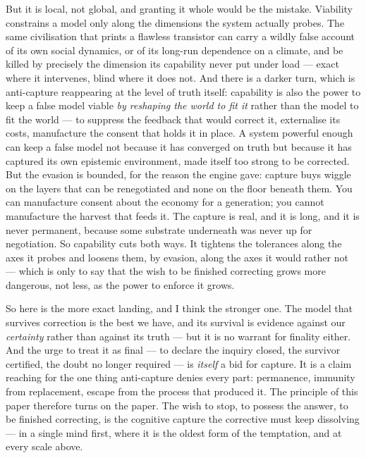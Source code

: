 \documentclass[11pt, a4paper]{report}
\begin{document}
But it is local, not global, and granting it whole would be the mistake. Viability constrains a model only along the dimensions the system actually probes. The same civilisation that prints a flawless transistor can carry a wildly false account of its own social dynamics, or of its long-run dependence on a climate, and be killed by precisely the dimension its capability never put under load --- exact where it intervenes, blind where it does not. And there is a darker turn, which is anti-capture reappearing at the level of truth itself: capability is also the power to keep a false model viable \textit{by reshaping the world to fit it} rather than the model to fit the world --- to suppress the feedback that would correct it, externalise its costs, manufacture the consent that holds it in place. A system powerful enough can keep a false model not because it has converged on truth but because it has captured its own epistemic environment, made itself too strong to be corrected. But the evasion is bounded, for the reason the engine gave: capture buys wiggle on the layers that can be renegotiated and none on the floor beneath them. You can manufacture consent about the economy for a generation; you cannot manufacture the harvest that feeds it. The capture is real, and it is long, and it is never permanent, because some substrate underneath was never up for negotiation. So capability cuts both ways. It tightens the tolerances along the axes it probes and loosens them, by evasion, along the axes it would rather not --- which is only to say that the wish to be finished correcting grows more dangerous, not less, as the power to enforce it grows.

So here is the more exact landing, and I think the stronger one. The model that survives correction is the best we have, and its survival is evidence against our \textit{certainty} rather than against its truth --- but it is no warrant for finality either. And the urge to treat it as final --- to declare the inquiry closed, the survivor certified, the doubt no longer required --- is \textit{itself} a bid for capture. It is a claim reaching for the one thing anti-capture denies every part: permanence, immunity from replacement, escape from the process that produced it. The principle of this paper therefore turns on the paper. The wish to stop, to possess the answer, to be finished correcting, is the cognitive capture the corrective must keep dissolving --- in a single mind first, where it is the oldest form of the temptation, and at every scale above.
\end{document}

